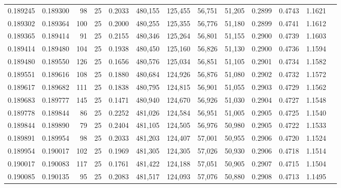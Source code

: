 \begin{tabular}{rrrrrrrrrrrrr}
0.189245 & 0.189300 &    98 &  25 &                                     0.2033 & 480,155 & 125,455 &  56,751 &  51,205 & 0.2899 & 0.4743 & 1.1621 \\
0.189302 & 0.189364 &   100 &  25 &                                     0.2000 & 480,255 & 125,355 &  56,776 &  51,180 & 0.2899 & 0.4741 & 1.1612 \\
0.189365 & 0.189414 &    91 &  25 &                                     0.2155 & 480,346 & 125,264 &  56,801 &  51,155 & 0.2900 & 0.4739 & 1.1603 \\
0.189414 & 0.189480 &   104 &  25 &                                     0.1938 & 480,450 & 125,160 &  56,826 &  51,130 & 0.2900 & 0.4736 & 1.1594 \\
0.189480 & 0.189550 &   126 &  25 &                                     0.1656 & 480,576 & 125,034 &  56,851 &  51,105 & 0.2901 & 0.4734 & 1.1582 \\
0.189551 & 0.189616 &   108 &  25 &                                     0.1880 & 480,684 & 124,926 &  56,876 &  51,080 & 0.2902 & 0.4732 & 1.1572 \\
0.189617 & 0.189682 &   111 &  25 &                                     0.1838 & 480,795 & 124,815 &  56,901 &  51,055 & 0.2903 & 0.4729 & 1.1562 \\
0.189683 & 0.189777 &   145 &  25 &                                     0.1471 & 480,940 & 124,670 &  56,926 &  51,030 & 0.2904 & 0.4727 & 1.1548 \\
0.189778 & 0.189844 &    86 &  25 &                                     0.2252 & 481,026 & 124,584 &  56,951 &  51,005 & 0.2905 & 0.4725 & 1.1540 \\
0.189844 & 0.189890 &    79 &  25 &                                     0.2404 & 481,105 & 124,505 &  56,976 &  50,980 & 0.2905 & 0.4722 & 1.1533 \\
0.189891 & 0.189954 &    98 &  25 &                                     0.2033 & 481,203 & 124,407 &  57,001 &  50,955 & 0.2906 & 0.4720 & 1.1524 \\
0.189954 & 0.190017 &   102 &  25 &                                     0.1969 & 481,305 & 124,305 &  57,026 &  50,930 & 0.2906 & 0.4718 & 1.1514 \\
0.190017 & 0.190083 &   117 &  25 &                                     0.1761 & 481,422 & 124,188 &  57,051 &  50,905 & 0.2907 & 0.4715 & 1.1504 \\
0.190085 & 0.190135 &    95 &  25 &                                     0.2083 & 481,517 & 124,093 &  57,076 &  50,880 & 0.2908 & 0.4713 & 1.1495 \\

\end{tabular}

